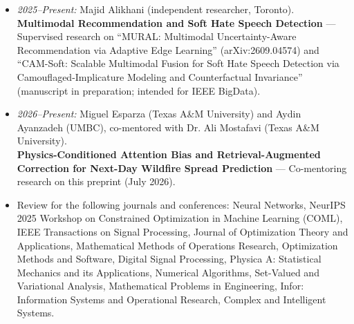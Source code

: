 \documentclass[letterpaper,11pt]{article}
\newcommand{\resitem}[1]{\item #1 \vspace{-2pt}}
\newcommand{\resheading}[1]{\par\vspace{0.6em}\noindent{\large\textbf{#1}}\par\vspace{0.25em}}
\begin{document}
\begin{itemize}
\begin{itemize}
            \item \textit{2025--Present:} Majid Alikhani (independent researcher, Toronto). \\
                \textbf{Multimodal Recommendation and Soft Hate Speech Detection} --- Supervised research on ``MURAL: Multimodal Uncertainty-Aware Recommendation via Adaptive Edge Learning'' (arXiv:2609.04574) and ``CAM-Soft: Scalable Multimodal Fusion for Soft Hate Speech Detection via Camouflaged-Implicature Modeling and Counterfactual Invariance'' (manuscript in preparation; intended for IEEE BigData).

            \item \textit{2026--Present:} Miguel Esparza (Texas A\&M University) and Aydin Ayanzadeh (UMBC), co-mentored with Dr. Ali Mostafavi (Texas A\&M University). \\
                \textbf{Physics-Conditioned Attention Bias and Retrieval-Augmented Correction for Next-Day Wildfire Spread Prediction} --- Co-mentoring research on this preprint (July 2026).
        \end{itemize}
\end{itemize}
\resheading{ \LARGE{Review Experience}}
\begin{itemize}
\resitem{Review for the following journals and conferences: Neural Networks, NeurIPS 2025 Workshop on Constrained Optimization in Machine Learning (COML), IEEE Transactions on Signal Processing, Journal of Optimization Theory and Applications, Mathematical Methods of Operations Research, Optimization Methods and Software, Digital Signal Processing, Physica A: Statistical Mechanics and its Applications, Numerical Algorithms, Set-Valued and Variational Analysis,
Mathematical Problems in Engineering, Infor: Information Systems and Operational Research, Complex and Intelligent Systems.}
\end{itemize}
\end{document}
